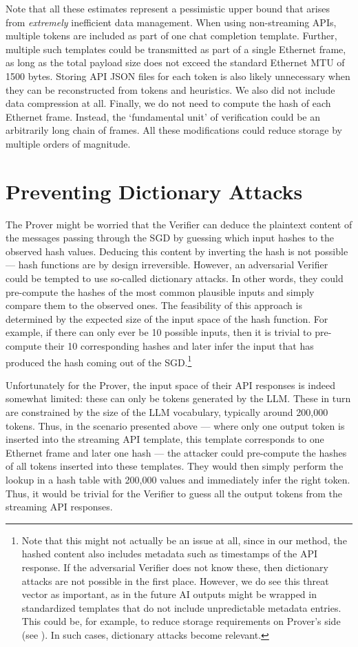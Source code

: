 \documentclass{article}
\begin{document}
Note that all these estimates represent a pessimistic upper bound that arises from \textit{extremely} inefficient data management. When using non-streaming APIs, multiple tokens are included as part of one chat completion template. Further, multiple such templates could be transmitted as part of a single Ethernet frame, as long as the total payload size does not exceed the standard Ethernet MTU of 1500 bytes. Storing API JSON files for each token is also likely unnecessary when they can be reconstructed from tokens and heuristics. We also did not include data compression at all. Finally, we do not need to compute the hash of each Ethernet frame. Instead, the `fundamental unit' of verification could be an arbitrarily long chain of frames. All these modifications could reduce storage by multiple orders of magnitude.

\section{Preventing Dictionary Attacks}
\label{app:dictionary}

The Prover might be worried that the Verifier can deduce the plaintext content of the messages passing through the SGD by guessing which input hashes to the observed hash values. Deducing this content by inverting the hash is not possible --- hash functions are by design irreversible. However, an adversarial Verifier could be tempted to use so-called dictionary attacks. In other words, they could pre-compute the hashes of the most common plausible inputs and simply compare them to the observed ones. The feasibility of this approach is determined by the expected size of the input space of the hash function. For example, if there can only ever be 10 possible inputs, then it is trivial to pre-compute their 10 corresponding hashes and later infer the input that has produced the hash coming out of the SGD.\footnote{Note that this might not actually be an issue at all, since in our method, the hashed content also includes metadata such as timestamps of the API response. If the adversarial Verifier does not know these, then dictionary attacks are not possible in the first place. However, we do see this threat vector as important, as in the future AI outputs might be wrapped in standardized templates that do not include unpredictable metadata entries. This could be, for example, to reduce storage requirements on Prover's side (see ). In such cases, dictionary attacks become relevant.}

Unfortunately for the Prover, the input space of their API responses is indeed somewhat limited: these can only be tokens generated by the LLM. These in turn are constrained by the size of the LLM vocabulary, typically around 200{,}000 tokens. Thus, in the scenario presented above --- where only one output token is inserted into the streaming API template, this template corresponds to one Ethernet frame and later one hash --- the attacker could pre-compute the hashes of all tokens inserted into these templates. They would then simply perform the lookup in a hash table with 200{,}000 values and immediately infer the right token. Thus, it would be trivial for the Verifier to guess all the output tokens from the streaming API responses.
\end{document}
